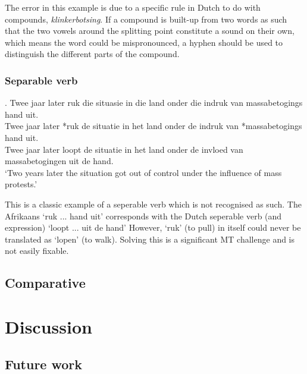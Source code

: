 \documentclass[11pt]{article}
\begin{document}
The error in this example is due to a specific rule in Dutch to do with 
compounds, \emph{klinkerbotsing}. If a compound is built-up from two words as such 
that the two vowels around the splitting point constitute a sound on their own, 
which means the word could be mispronounced, a hyphen should be used to distinguish 
the different parts of the compound. 

\subsubsection{Separable verb}

\ex. \label{ex:exsepverb} 
    Twee jaar later ruk die situasie in die land onder die indruk van massabetogings hand uit. \\
    Twee jaar later *ruk de situatie in het land onder de indruk van *massabetogings hand uit. \\
    Twee jaar later loopt de situatie in het land onder de invloed van massabetogingen uit de hand. \\
    `Two years later the situation got out of control under the influence of mass protests.'

This is a classic example of a seperable verb which is not recognised as such. The Afrikaans `ruk ... hand uit' corresponds with
 the Dutch seperable verb (and expression) `loopt ... uit de hand' However, `ruk' (to pull) in itself could never be translated as `lopen' (to walk). 
Solving this is a significant MT challenge and is not easily fixable.  

\subsection{Comparative}



\section{Discussion}

\subsection{Future work}
\end{document}
